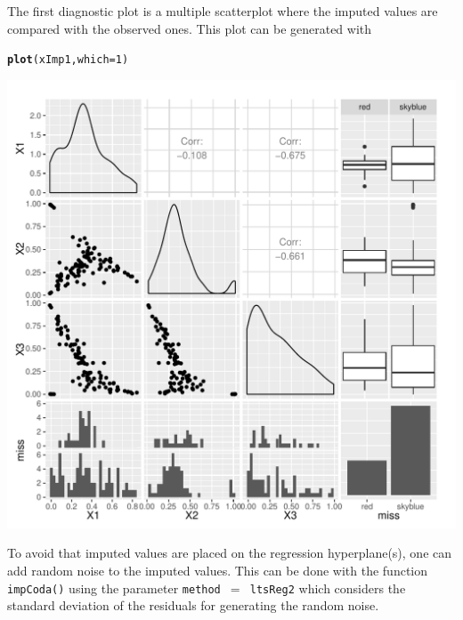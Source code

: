 \documentclass{scrartcl}\usepackage[]{graphicx}\usepackage[]{color}
\makeatletter
\def\maxwidth{ %
  \ifdim\Gin@nat@width>\linewidth
    \linewidth
  \else
    \Gin@nat@width
  \fi
}
\newcommand{\hlnum}[1]{\textcolor[rgb]{0.686,0.059,0.569}{#1}}%
\newcommand{\hlstd}[1]{\textcolor[rgb]{0.345,0.345,0.345}{#1}}%
\newcommand{\hlkwc}[1]{\textcolor[rgb]{0.333,0.667,0.333}{#1}}%
\newcommand{\hlkwd}[1]{\textcolor[rgb]{0.737,0.353,0.396}{\textbf{#1}}}%
\newenvironment{kframe}{%
 \def\at@end@of@kframe{}%
 \ifinner\ifhmode%
  \def\at@end@of@kframe{\end{minipage}}%
  \begin{minipage}{\columnwidth}%
 \fi\fi%
 \def\FrameCommand##1{\hskip\@totalleftmargin \hskip-\fboxsep
 \colorbox{shadecolor}{##1}\hskip-\fboxsep
     \hskip-\linewidth \hskip-\@totalleftmargin \hskip\columnwidth}%
 \MakeFramed {\advance\hsize-\width
   \@totalleftmargin\z@ \linewidth\hsize
   \@setminipage}}%
 {\par\unskip\endMakeFramed%
 \at@end@of@kframe}
\newenvironment{knitrout}{}{} %
\makeatother
\begin{document}
The first diagnostic plot is a multiple
scatterplot where the imputed values are compared with the observed ones. 
This plot can be generated with 
\begin{knitrout}
\color{fgcolor}\begin{kframe}
\begin{alltt}
\hlkwd{plot}\hlstd{(xImp1,} \hlkwc{which}\hlstd{=}\hlnum{1}\hlstd{)}
\end{alltt}
\end{kframe}
\includegraphics[width=\maxwidth]{figure/unnamed-chunk-4-1} 

\end{knitrout}

To avoid that imputed values are 
placed on the regression hyperplane(s), one
can add random noise to the imputed values. This can be done with the function
\texttt{impCoda()} using the parameter \texttt{method $=$ ltsReg2} which considers
the standard deviation of the residuals for generating the random noise. 
% 
\end{document}
